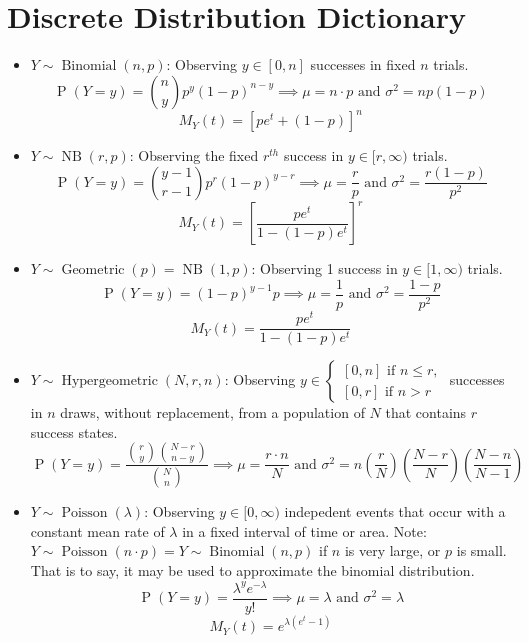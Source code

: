 \documentclass[fontsize=12pt]{article}
\newcommand{\If}[1]{\textrm{ if #1}}
\newcommand{\defn}[1]{\textbf{#1}:}
\newcommand{\pr}[1]{\operatorname{P}(#1)}
\newcommand{\binomdist}[3]{#1 \sim \operatorname{Binomial}(#2, #3)}
\newcommand{\geodist}[2]{#1 \sim \operatorname{Geometric}(#2)}
\newcommand{\nbinomdist}[3]{#1 \sim \operatorname{NB}(#2, #3)}
\newcommand{\hypegeodist}[4]{#1 \sim \operatorname{Hypergeometric}(#2, #3, #4)}
\newcommand{\poisson}[2]{#1 \sim \operatorname{Poisson}(#2)}
\renewcommand{\and}{\text{ and }}
\begin{document}
\section{Discrete Distribution Dictionary}
\begin{itemize}
    \item \defn{$\binomdist{Y}{n}{p}$}
    Observing $y \in [0,n]$ successes in fixed $n$ trials.
    \[
        \pr{Y=y} = \binom{n}{y}p^y(1-p)^{n-y} \implies \mu = n\cdot p \and \sigma^2 = np(1-p)
    \]
    \[
        M_Y(t) = \left[pe^t+(1-p)\right]^n
    \]
    \item \defn{$\nbinomdist{Y}{r}{p}$}
    Observing the fixed $r^{th}$ success in $y \in [r, \infty)$ trials.
    \[
        \pr{Y=y} = \binom{y-1}{r-1}p^{r}(1-p)^{y-r} \implies \mu = \frac{r}{p} \and \sigma^2 = \frac{r(1-p)}{p^2}
    \]
    \[
        M_Y(t) = {\left[\frac{pe^t}{1-(1-p)e^t}\right]}^r
    \]
    \item \defn{$\geodist{Y}{p} = \operatorname{NB}(1,p)$}
    Observing 1 success in $y \in [1, \infty)$ trials.
    \[
        \pr{Y=y} = (1-p)^{y-1}p \implies \mu = \frac{1}{p} \and \sigma^2 = \frac{1-p}{p^2}
    \]
    \[
        M_Y(t) = \frac{pe^t}{1-(1-p)e^t}
    \]
    \item \defn{$\hypegeodist{Y}{N}{r}{n}$}
    Observing $y \in \begin{cases}
        [0, n] \If{} n \leq r,\\
        [0, r] \If{} n > r
    \end{cases}$ successes in $n$ draws, without replacement,
    from a population of $N$ that contains $r$ success states.
    \[
        \pr{Y=y} = \frac{\binom{r}{y}\binom{N-r}{n-y}}{\binom{N}{n}}
        \implies \mu = \frac{r\cdot n}{N} \and \sigma^2 = 
        n\left(\frac{r}{N}\right)\left(\frac{N-r}{N}\right)\left(\frac{N-n}{N-1}\right)
    \]

    \item \defn{$\poisson{Y}{\lambda}$}
    Observing $y\in [0,\infty)$ indepedent events that occur with a
    constant mean rate of $\lambda$ in a fixed interval of time or area.
    Note: $\poisson{Y}{n\cdot p} = \binomdist{Y}{n}{p}$ if $n$ is very large, or $p$ is small.
    That is to say, it may be used to approximate the binomial distribution.
    \[
        \pr{Y=y} = \frac{\lambda^{y}e^{-\lambda}}{y!} \implies \mu = \lambda \and \sigma^2 = \lambda
    \]
    \[
        M_Y(t) = e^{\lambda(e^t-1)}
    \]
\end{itemize}


\clearpage
\end{document}
